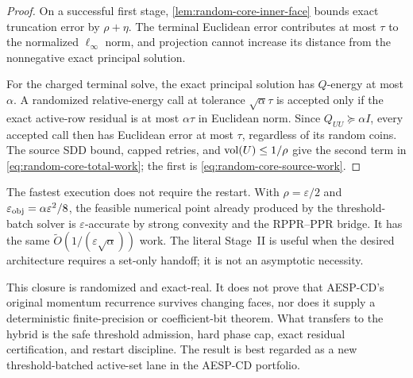 \begin{proof}
On a successful first stage,
\cref{lem:random-core-inner-face} bounds exact truncation error by
$\rho+\eta$.  The terminal Euclidean error contributes at most $\tau$ to the
normalized $\ell_\infty$ norm, and projection cannot increase its distance
from the nonnegative exact principal solution.

For the charged terminal solve, the exact principal solution has
$Q$-energy at most $\alpha$.  A randomized relative-energy call at tolerance
$\sqrt\alpha\tau$ is accepted only if the exact active-row residual is at
most $\alpha\tau$ in Euclidean norm.  Since $Q_{UU}\succeq\alpha I$, every
accepted call then has Euclidean error at most $\tau$, regardless of its
random coins.  The source SDD bound, capped retries, and
$\operatorname{vol}(U)\leq1/\rho$ give the second term in
\cref{eq:random-core-total-work}; the first is
\cref{eq:random-core-source-work}.
\end{proof}

The fastest execution does not require the restart.  With
$\rho=\varepsilon/2$ and
$\varepsilon_{\rm obj}=\alpha\varepsilon^2/8$, the feasible numerical point
already produced by the threshold-batch solver is $\varepsilon$-accurate by
strong convexity and the RPPR--PPR bridge.  It has the same
$\widetilde O(1/(\varepsilon\sqrt\alpha))$ work.  The literal Stage~II is
useful when the desired architecture requires a set-only handoff; it is not
an asymptotic necessity.

This closure is randomized and exact-real.  It does not prove that AESP-CD's
original momentum recurrence survives changing faces, nor does it supply a
deterministic finite-precision or coefficient-bit theorem.  What transfers to
the hybrid is the safe threshold admission, hard phase cap, exact residual
certification, and restart discipline.  The result is best regarded as a new
threshold-batched active-set lane in the AESP-CD portfolio.

